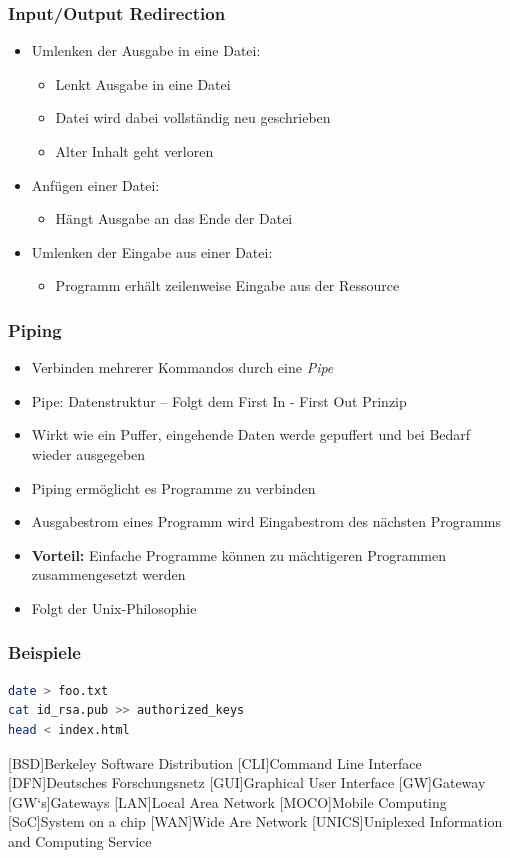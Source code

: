 \documentclass[xcolor=dvipsnames,aspectratio=169]{beamer}
\begin{document}
\begin{frame}
	\frametitle{Input/Output Redirection}
\begin{itemize}
	\item Umlenken der Ausgabe in eine Datei: \keys{>}
		\begin{itemize}
			\item Lenkt Ausgabe in eine Datei
			\item Datei wird dabei vollständig neu geschrieben
			\item Alter Inhalt geht verloren
		\end{itemize}
	\item Anfügen einer Datei: \keys{>>}
	\begin{itemize}
		\item Hängt Ausgabe an das Ende der Datei 
	\end{itemize}
	\item Umlenken der Eingabe aus einer Datei: \keys{<}
		\begin{itemize}
			\item Programm erhält zeilenweise Eingabe aus der Ressource
		\end{itemize}
\end{itemize}
\end{frame}

\begin{frame}
	\frametitle{Piping}
\begin{itemize}
	\item Verbinden mehrerer Kommandos durch eine \emph{Pipe}
	\item Pipe: Datenstruktur -- Folgt dem First In - First Out Prinzip
	\item Wirkt wie ein Puffer, eingehende Daten werde gepuffert und bei Bedarf wieder ausgegeben
	\item Piping ermöglicht es Programme zu verbinden
	\item Ausgabestrom eines Programm wird Eingabestrom des nächsten Programms
	\item \textbf{Vorteil:} Einfache Programme können zu mächtigeren Programmen zusammengesetzt werden
	\item Folgt der Unix-Philosophie
\end{itemize}
\end{frame}

\begin{frame}[fragile]
	\frametitle{Beispiele}
	\begin{lstlisting}[style=Bash, language=Bash]
date > foo.txt
cat id_rsa.pub >> authorized_keys
head < index.html
	\end{lstlisting}
\end{frame}

\begin{acronym}
[BSD]{Berkeley Software Distribution}
[CLI]{Command Line Interface}
[DFN]{Deutsches Forschungsnetz}
[GUI]{Graphical User Interface}
[GW]{Gateway}
[GW`s]{Gateways}
[LAN]{Local Area Network}
[MOCO]{Mobile Computing}
[SoC]{System on a chip}
[WAN]{Wide Are Network}
[UNICS]{Uniplexed Information and Computing Service}
\end{acronym}
\end{document}
